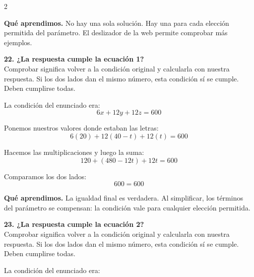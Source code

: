 \documentclass[11pt,a4paper,landscape]{article}
\begin{document}
\begin{multicols*}{2}
\begin{minipage}{\linewidth}
\par{}\par\smallskip
\par\smallskip\textbf{Qué aprendimos.} No hay una sola solución. Hay una para cada elección permitida del parámetro. El deslizador de la web permite comprobar más ejemplos.
\end{minipage}\par\medskip
\noindent\begin{minipage}{\linewidth}\textbf{22. ¿La respuesta cumple la ecuación 1?}\\[2pt]Comprobar significa volver a la condición original y calcularla con nuestra respuesta. Si los dos lados dan el mismo número, esta condición sí se cumple. Deben cumplirse todas.
\par\smallskip La condición del enunciado era:
\[6x + 12y + 12z = 600\]
\par\smallskip Ponemos nuestros valores donde estaban las letras:
\[6\left(20\right) + 12\left(40 - t\right) + 12\left(t\right)=600\]
\par\smallskip Hacemos las multiplicaciones y luego la suma:
\[120 + \left(480 - 12 t\right) + 12 t=600\]
\par\smallskip Comparamos los dos lados:
\[600=600\]
\par\smallskip\textbf{Qué aprendimos.} La igualdad final es verdadera. Al simplificar, los términos del parámetro se compensan: la condición vale para cualquier elección permitida.
\end{minipage}\par\medskip
\noindent\begin{minipage}{\linewidth}\textbf{23. ¿La respuesta cumple la ecuación 2?}\\[2pt]Comprobar significa volver a la condición original y calcularla con nuestra respuesta. Si los dos lados dan el mismo número, esta condición sí se cumple. Deben cumplirse todas.
\par\smallskip La condición del enunciado era:

\end{minipage}
\end{multicols*}
\end{document}
